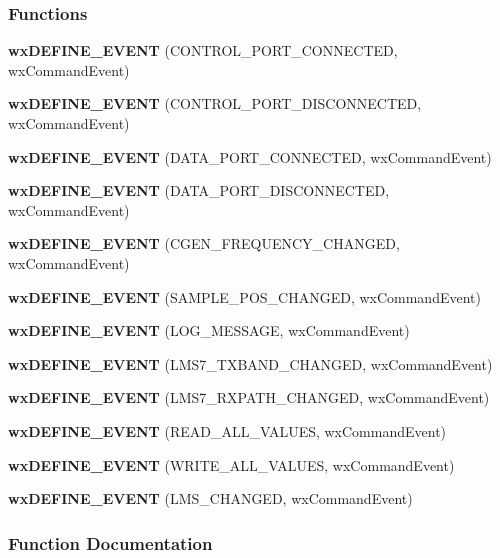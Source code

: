 \subsubsection*{Functions}
\begin{DoxyCompactItemize}
\item 
{\bf wx\+D\+E\+F\+I\+N\+E\+\_\+\+E\+V\+E\+NT} (C\+O\+N\+T\+R\+O\+L\+\_\+\+P\+O\+R\+T\+\_\+\+C\+O\+N\+N\+E\+C\+T\+ED, wx\+Command\+Event)
\item 
{\bf wx\+D\+E\+F\+I\+N\+E\+\_\+\+E\+V\+E\+NT} (C\+O\+N\+T\+R\+O\+L\+\_\+\+P\+O\+R\+T\+\_\+\+D\+I\+S\+C\+O\+N\+N\+E\+C\+T\+ED, wx\+Command\+Event)
\item 
{\bf wx\+D\+E\+F\+I\+N\+E\+\_\+\+E\+V\+E\+NT} (D\+A\+T\+A\+\_\+\+P\+O\+R\+T\+\_\+\+C\+O\+N\+N\+E\+C\+T\+ED, wx\+Command\+Event)
\item 
{\bf wx\+D\+E\+F\+I\+N\+E\+\_\+\+E\+V\+E\+NT} (D\+A\+T\+A\+\_\+\+P\+O\+R\+T\+\_\+\+D\+I\+S\+C\+O\+N\+N\+E\+C\+T\+ED, wx\+Command\+Event)
\item 
{\bf wx\+D\+E\+F\+I\+N\+E\+\_\+\+E\+V\+E\+NT} (C\+G\+E\+N\+\_\+\+F\+R\+E\+Q\+U\+E\+N\+C\+Y\+\_\+\+C\+H\+A\+N\+G\+ED, wx\+Command\+Event)
\item 
{\bf wx\+D\+E\+F\+I\+N\+E\+\_\+\+E\+V\+E\+NT} (S\+A\+M\+P\+L\+E\+\_\+\+P\+O\+S\+\_\+\+C\+H\+A\+N\+G\+ED, wx\+Command\+Event)
\item 
{\bf wx\+D\+E\+F\+I\+N\+E\+\_\+\+E\+V\+E\+NT} (L\+O\+G\+\_\+\+M\+E\+S\+S\+A\+GE, wx\+Command\+Event)
\item 
{\bf wx\+D\+E\+F\+I\+N\+E\+\_\+\+E\+V\+E\+NT} (L\+M\+S7\+\_\+\+T\+X\+B\+A\+N\+D\+\_\+\+C\+H\+A\+N\+G\+ED, wx\+Command\+Event)
\item 
{\bf wx\+D\+E\+F\+I\+N\+E\+\_\+\+E\+V\+E\+NT} (L\+M\+S7\+\_\+\+R\+X\+P\+A\+T\+H\+\_\+\+C\+H\+A\+N\+G\+ED, wx\+Command\+Event)
\item 
{\bf wx\+D\+E\+F\+I\+N\+E\+\_\+\+E\+V\+E\+NT} (R\+E\+A\+D\+\_\+\+A\+L\+L\+\_\+\+V\+A\+L\+U\+ES, wx\+Command\+Event)
\item 
{\bf wx\+D\+E\+F\+I\+N\+E\+\_\+\+E\+V\+E\+NT} (W\+R\+I\+T\+E\+\_\+\+A\+L\+L\+\_\+\+V\+A\+L\+U\+ES, wx\+Command\+Event)
\item 
{\bf wx\+D\+E\+F\+I\+N\+E\+\_\+\+E\+V\+E\+NT} (L\+M\+S\+\_\+\+C\+H\+A\+N\+G\+ED, wx\+Command\+Event)
\end{DoxyCompactItemize}


\subsubsection{Function Documentation}
